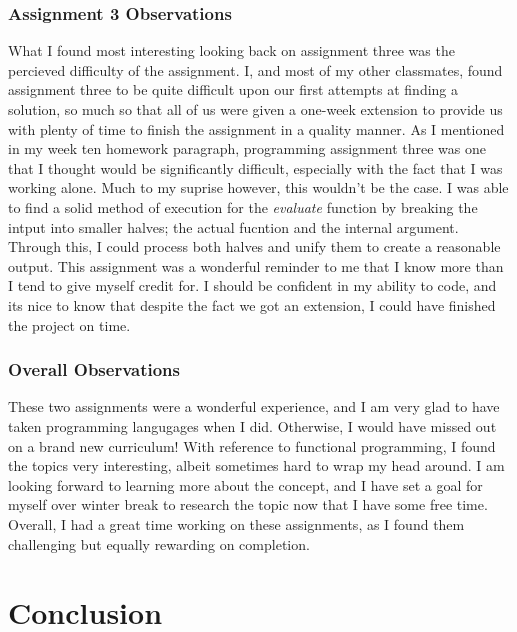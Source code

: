 \documentclass{article}
\theoremstyle{theorem}
\theoremstyle{definition}
\theoremstyle{remark}
\begin{document}
  \subsubsection*{Assignment 3 Observations}
  What I found most interesting looking back on assignment three was the percieved difficulty of the assignment. 
  I, and most of my other classmates, found assignment three to be quite difficult upon our first attempts at 
  finding a solution, so much so that all of us were given a one-week extension to provide us with plenty of time 
  to finish the assignment in a quality manner. As I mentioned in my week ten homework paragraph, programming 
  assignment three was one that I thought would be significantly difficult, especially with the fact that I was 
  working alone. Much to my suprise however, this wouldn't be the case. I was able to find a solid method of 
  execution for the \emph{evaluate} function by breaking the intput into smaller halves; the actual fucntion and the
  internal argument. Through this, I could process both halves and unify them to create a reasonable output. 
  This assignment was a wonderful reminder to me that I know more than I tend to give myself credit for. I should 
  be confident in my ability to code, and its nice to know that despite the fact we got an extension, I could have 
  finished the project on time.
  
  \subsubsection*{Overall Observations}
  These two assignments were a wonderful experience, and I am very glad to have taken programming langugages when 
  I did. Otherwise, I would have missed out on a brand new curriculum! With reference to functional programming, 
  I found the topics very interesting, albeit sometimes hard to wrap my head around. I am looking forward to learning 
  more about the concept, and I have set a goal for myself over winter break to research the topic now that I have some 
  free time. Overall, I had a great time working on these assignments, as I found them challenging but equally 
  rewarding on completion.

  \section{Conclusion}\label{conclusion}
\end{document}
